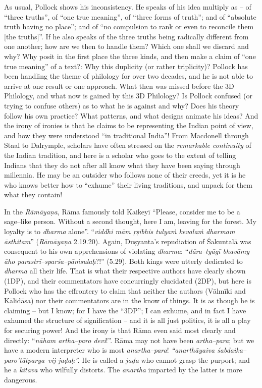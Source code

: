 {{As usual, Pollock shows his inconsistency. He speaks of his idea multiply as – of “three truths”, of “one true meaning”, of “three forms of truth”; and of “absolute truth having no place”; and of “no compulsion to rank or even to reconcile them [the truths]”. If he also speaks of the three truths being radically different from one another; how are we then to handle them? Which one shall we discard and why? Why posit in the first place the three kinds, and then make a claim of “one true meaning” of a text?: Why this duplicity (or rather triplicity)? Pollock has been handling the theme of philology for over two decades, and he is not able to arrive at one result or one approach. What then was missed before the 3D Philology, and what now is gained by this 3D Philology? Is Pollock confused (or trying to confuse others) as to what he is against and why? Does his theory follow his own practice? What patterns, and what designs animate his ideas? And the irony of ironies is that he claims to be representing the Indian point of view, and how they were understood “in traditional India”! From Macdonell through Staal to Dalrymple, scholars have often stressed on the \textit{remarkable continuity} of the Indian tradition, and here is a scholar who goes to the extent of telling Indians that they do not after all know what they have been saying through millennia. He may be an outsider who follows none of their creeds, yet it is he who knows better how to “exhume” their living traditions, and unpack for them what they contain!

In the \textit{Rāmāyaṇa}, Rāma famously told Kaikeyī “Please, consider me to be a sage–like person. Without a second thought, here I am, leaving for the forest. My loyalty is to \textit{dharma} alone”. “\textit{viddhi mām ṛṣibhis tulyaṁ kevalaṁ dharmam āsthitam}” (\textit{Rāmāyaṇa} 2.19.20). Again, Duṣyanta’s repudiation of Śakuntalā was consequent to his own apprehensions of violating \textit{dharma}: “\textit{dāra–tyāgī bhavāmy āho parastrī–sparśa–pāṁsulaḥ}?!” (5.29). Both kings were utterly dedicated to \textit{dharma} all their life. That is what their respective authors have clearly shown (1DP), and their commentators have concurringly elucidated (2DP), but here is Pollock who has the effrontery to claim that neither the authors (Vālmīki and Kālidāsa) nor their commentators are in the know of things. It is as though he is claiming – but I know; for I have the “3DP”; I can exhume, and in fact I have exhumed the structure of signification – and it is all just politics, it is all a play for securing power! And the irony is that Rāma even said most clearly and directly: “\textit{nāham artha–paro devi}!”. Rāma may not have been \textit{artha–para}; but we have a modern interpreter who is most \textit{anartha–para}! \textit{“anarthāyaiva śabdaika–paro’tātparya–vij jaḍaḥ”.} He is called a \textit{jaḍa} who cannot grasp the purport; and he a \textit{kitava} who wilfully distorts. The \textit{anartha} imparted by the latter is more dangerous.

}}
